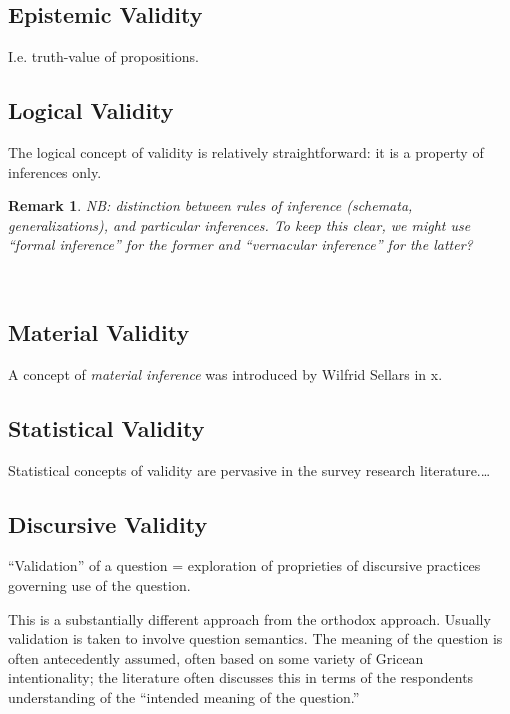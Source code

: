 \documentclass[11pt,twoside]{article}
\newtheorem{remark}{Remark}
\newcommand{\sr}{survey research}
\begin{document}
\subsection{Epistemic Validity}

I.e. truth-value of propositions.

\subsection{Logical Validity}

The logical concept of validity is relatively straightforward: it is a
property of inferences only.

\begin{remark}
  NB: distinction between rules of inference (schemata,
  generalizations), and particular inferences.  To keep this clear, we
  might use \enquote{formal inference} for the former and
  \enquote{vernacular inference} for the latter?
\end{remark}

\noindent
\cite{prawitz_inference_2009} \\
\cite{prawitz_epistemic_2011}

\subsection{Material Validity}

A concept of \textit{material inference} was introduced by Wilfrid Sellars in x.

\subsection{Statistical Validity}

Statistical concepts of validity are pervasive in the \sr{} literature.\ldots

\subsection{Discursive Validity}

\enquote{Validation} of a question = exploration of proprieties of
discursive practices governing use of the question.

This is a substantially different approach from the orthodox approach.
Usually validation is taken to involve question semantics.  The
meaning of the question is often antecedently assumed, often based on
some variety of Gricean intentionality; the literature often discusses
this in terms of the respondents understanding of the
\enquote{intended meaning of the question.}
\end{document}
